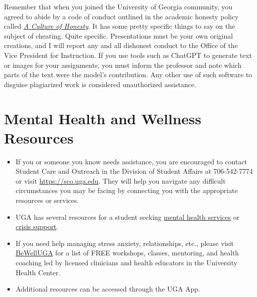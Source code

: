 \documentclass[11pt, letterpaper]{article}
\begin{document}
Remember that when you joined the University of Georgia community, you agreed to abide by a code of conduct outlined in the academic honesty policy called \href{https://honesty.uga.edu/Academic-Honesty-Policy/Introduction/}{\textit{A Culture of Honesty}}. It has some pretty specific things to say on the subject of cheating. Quite specific. Presentations must be your own original creations, and I will report any and all dishonest conduct to the Office of the Vice President for Instruction. If you use tools such as ChatGPT to generate text or images for your assignments, you must inform the professor and note which parts of the text were the model's contribution. Any other use of such software to disguise plagiarized work is considered unauthorized assistance.

\section*{Mental Health and Wellness Resources}

\begin{itemize}
\item If you or someone you know needs assistance, you are encouraged to contact Student Care and Outreach in the Division of Student Affairs at 706-542-7774 or visit \href{https://sco.uga.edu}{https://sco.uga.edu}. They will help you navigate any difficult circumstances you may be facing by connecting you with the appropriate resources or services. 
\item UGA has several resources for a student seeking \href{https://www.uhs.uga.edu/bewelluga/bewelluga}{mental health services} or \href{https://www.uhs.uga.edu/info/emergencies}{crisis support}. 
\item If you need help managing stress anxiety, relationships, etc., please visit \href{https://www.uhs.uga.edu/bewelluga/bewelluga}{BeWellUGA} for a list of FREE workshops, classes, mentoring, and health coaching led by licensed clinicians and health educators in the University Health Center.
\item Additional resources can be accessed through the UGA App.
\end{itemize}



\end{document}

